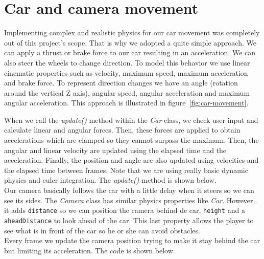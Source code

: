 

\section{Car and camera movement}
\label{sec:imp-car}

Implementing complex and realistic physics for our car movement was completely out of
this project's scope. That is why we adopted a quite simple approach. We can apply
a thrust or brake force to our car resulting in an acceleration. We can also steer
the wheels to change direction. To model this behavior we use linear cinematic properties
such as velocity, maximum speed, maximum acceleration and brake force. To represent
direction changes we have an angle (rotation around the vertical Z axis), angular
speed, angular acceleration and maximum angular acceleration. This approach is illustrated
in figure~\ref{fig:car-movement}.\\


When we call the \textit{update()} method within the \textit{Car} class, we check
user input and calculate linear and angular forces. Then, these forces are applied
to obtain accelerations which are clamped so they cannot surpass the maximum. Then,
the angular and linear velocity are updated using the elapsed time and the acceleration.
Finally, the position and angle are also updated using velocities and the elapsed time
between frames. Note that we are using really basic dynamic physics and euler
integration. The \textit{update()} method is shown below.\\



Our camera basically follows the car with a little delay when it steers so we can
see its sides. The \textit{Camera} class has similar physics properties like \textit{Car}.
However, it adds \texttt{distance} so we can position the camera behind de car, \texttt{height}
and a \texttt{aheadDistance} to look ahead of the car. This last property allows the player
to see what is in front of the car so he or she can avoid obstacles.\\

Every frame we update the camera position trying to make it stay behind the car
but limiting its acceleration. The code is shown below.\\

